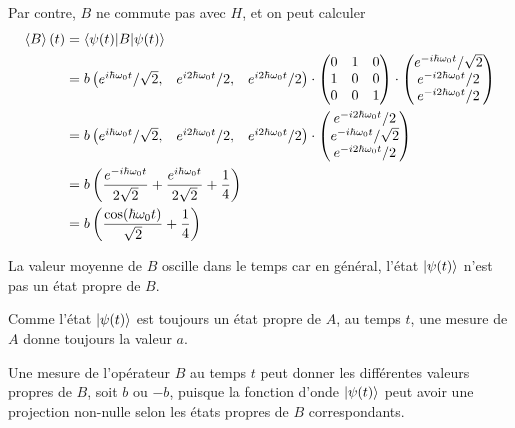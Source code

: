 \documentclass[12pt,solution=false]{uqtrassignment}
\begin{document}
\begin{problem}{}
\begin{solution}
Par contre, $B$ ne commute pas avec $H$, et on peut calculer
\begin{align}
  \braket{B}(t)
  &=
  \braket{\psi(t) \vert B \vert \psi(t)}
  \\
  &=
  b
  \begin{pmatrix}
  e^{i\hbar \omega_0 t} / \sqrt{2}, &
  e^{i2\hbar \omega_0 t} / 2, &
  e^{i2\hbar \omega_0 t} / 2 
  \end{pmatrix}
  \cdot
  \begin{pmatrix}
     0 & 1 & 0 \\
     1 & 0 & 0 \\
     0 & 0 & 1 \\
  \end{pmatrix}
  \cdot
  \begin{pmatrix}
  e^{-i\hbar \omega_0 t} / \sqrt{2} \\
  e^{-i2\hbar \omega_0 t} / 2 \\
  e^{-i2\hbar \omega_0 t} / 2 \\
  \end{pmatrix}
  \\
  &=
  b
  \begin{pmatrix}
  e^{i\hbar \omega_0 t} / \sqrt{2}, &
  e^{i2\hbar \omega_0 t} / 2, &
  e^{i2\hbar \omega_0 t} / 2 
  \end{pmatrix}
  \cdot
  \begin{pmatrix}
  e^{-i2\hbar \omega_0 t} / 2 \\
  e^{-i\hbar \omega_0 t} / \sqrt{2} \\
  e^{-i2\hbar \omega_0 t} / 2 \\
  \end{pmatrix}
  \\
  &=
  b
  \left(
  \frac{e^{-i\hbar \omega_0 t}}{ 2 \sqrt{2}}
  +
  \frac{e^{ i\hbar \omega_0 t}}{ 2 \sqrt{2}}
  +
  \frac{1}{4}
  \right)
  \\
  &=
  b
  \left(
  \frac{\cos(\hbar \omega_0 t)}{\sqrt{2}}
  +
  \frac{1}{4}
  \right)
\end{align}

La valeur moyenne de $B$ oscille dans le temps
  car en général, l'état $\ket{\psi(t)}$ n'est pas un état propre de $B$.


\subproblem
Comme l'état $\ket{\psi(t)}$ est toujours un état propre de $A$,
  au temps $t$, une mesure de $A$ donne toujours la valeur $a$.
%

Une mesure de l'opérateur $B$ au temps $t$
  peut donner les différentes valeurs propres de $B$,
  soit $b$ ou $-b$,
  puisque la fonction d'onde $\ket{\psi(t)}$ peut avoir une projection
  non-nulle selon les états propres de $B$ correspondants.





\end{solution}
\end{problem}
\end{document}
